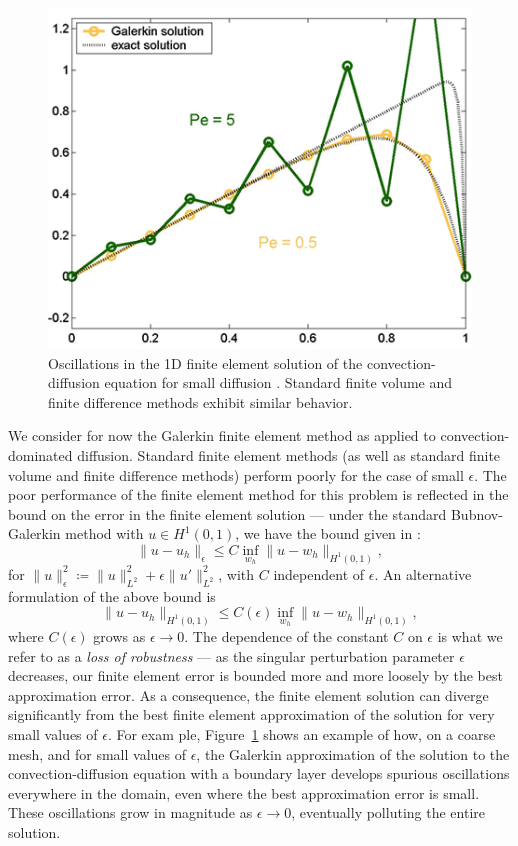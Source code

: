 \begin{figure}[!h]
\centering
\includegraphics[scale=.4]{figs/GalerkinOscTight.png}
\caption{Oscillations in the 1D finite element solution of the convection-diffusion equation for small diffusion \cite{GalerkinOsc}. Standard finite volume and finite difference methods exhibit similar behavior.}
\label{fig:GalerkinOsc}
\end{figure}
We consider for now the Galerkin finite element method as applied to convection-dominated diffusion.  Standard finite element methods (as well as standard finite volume and finite difference methods) perform poorly for the case of small $\epsilon$.  The poor performance of the finite element method for this problem is reflected in the bound on the error in the finite element solution --- under the standard Bubnov-Galerkin method with $u\in H^1(0,1)$, we have the bound given in \cite{roos2008robust}:
\[
\|u-u_h\|_\epsilon \leq C \inf_{w_h}\|u-w_h\|_{H^1(0,1)},
\]
for $\|u\|_\epsilon^2 \coloneqq \|u\|_{L^2}^2 + \epsilon \|u'\|_{L^2}^2$, with $C$ independent of $\epsilon$. An alternative formulation of the above bound is 
\[
\|u-u_h\|_{H^1(0,1)} \leq C(\epsilon) \inf_{w_h}\|u-w_h\|_{H^1(0,1)},
\]
where $C(\epsilon)$ grows as $\epsilon\rightarrow 0$. The dependence of the constant $C$ on $\epsilon$ is what we refer to as a \textit{loss of robustness} --- as the singular perturbation parameter $\epsilon$ decreases, our finite element error is bounded more and more loosely by the best approximation error.  As a consequence, the finite element solution can diverge significantly from the best finite element approximation of the solution for very small values of $\epsilon$.  For exam ple, Figure~\ref{fig:GalerkinOsc} shows an example of how, on a coarse mesh, and for small values of $\epsilon$, the Galerkin approximation of the solution to the convection-diffusion equation with a boundary layer develops spurious oscillations everywhere in the domain, even where the best approximation error is small.  These oscillations grow in magnitude as $\epsilon \rightarrow 0$, eventually polluting the entire solution.  

